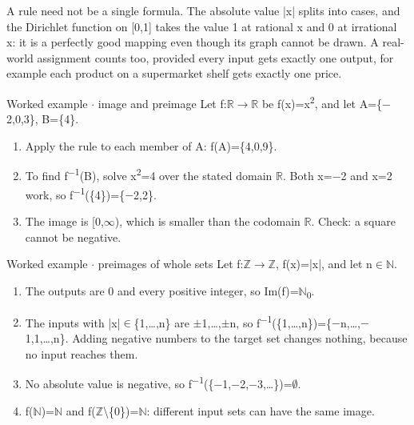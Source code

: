 \documentclass[11pt]{article}
\begin{document}
\begin{keepsection}
A rule need not be a single formula. The absolute value |x| splits into cases, and the Dirichlet function on [0,1] takes the value 1 at rational x and 0 at irrational x: it is a perfectly good mapping even though its graph cannot be drawn. A real-world assignment counts too, provided every input gets exactly one output, for example each product on a supermarket shelf gets exactly one price.

\begin{workedbox}{Worked example \ensuremath{\cdot} image and preimage}
Let f:\ensuremath{\mathbb{R}}\ensuremath{\to}\ensuremath{\mathbb{R}} be f(x)=x\textsuperscript{2}, and let A=\{\ensuremath{-}2,0,3\}, B=\{4\}.

\begin{enumerate}
\item Apply the rule to each member of A: f(A)=\{4,0,9\}.
\item To find f\textsuperscript{\ensuremath{-}1}(B), solve x\textsuperscript{2}=4 over the stated domain \ensuremath{\mathbb{R}}. Both x=\ensuremath{-}2 and x=2 work, so f\textsuperscript{\ensuremath{-}1}(\{4\})=\{\ensuremath{-}2,2\}.
\item The image is [0,\ensuremath{\infty}), which is smaller than the codomain \ensuremath{\mathbb{R}}. Check: a square cannot be negative.
\end{enumerate}
\end{workedbox}

\begin{workedbox}{Worked example \ensuremath{\cdot} preimages of whole sets}
Let f:\ensuremath{\mathbb{Z}}\ensuremath{\to}\ensuremath{\mathbb{Z}}, f(x)=|x|, and let n\ensuremath{\in}\ensuremath{\mathbb{N}}.

\begin{enumerate}
\item The outputs are 0 and every positive integer, so Im(f)=\ensuremath{\mathbb{N}}\textsubscript{0}.
\item The inputs with |x|\ensuremath{\in}\{1,…,n\} are \ensuremath{\pm}1,…,\ensuremath{\pm}n, so f\textsuperscript{\ensuremath{-}1}(\{1,…,n\})=\{\ensuremath{-}n,…,\ensuremath{-}1,1,…,n\}. Adding negative numbers to the target set changes nothing, because no input reaches them.
\item No absolute value is negative, so f\textsuperscript{\ensuremath{-}1}(\{\ensuremath{-}1,\ensuremath{-}2,\ensuremath{-}3,…\})=\ensuremath{\emptyset}.
\item f(\ensuremath{\mathbb{N}})=\ensuremath{\mathbb{N}} and f(\ensuremath{\mathbb{Z}}\textbackslash{}\{0\})=\ensuremath{\mathbb{N}}: different input sets can have the same image.
\end{enumerate}


\end{workedbox}
\end{keepsection}
\end{document}
